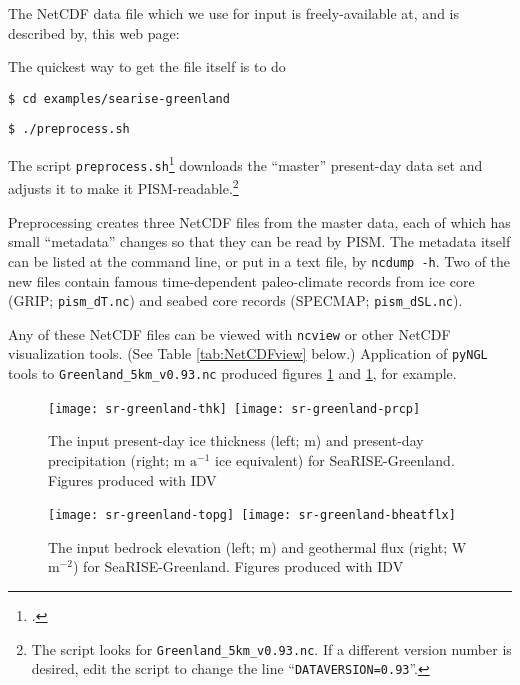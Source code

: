 The NetCDF data file which we use for input is freely-available at, and is described by, this web page: 
\medskip

\centerline{}
\medskip

\noindent The quickest way to get the file itself is to do

\verb|$ cd examples/searise-greenland|

\verb|$ ./preprocess.sh|

\noindent The script \verb|preprocess.sh|\footnote{.} downloads the ``master'' present-day data set and adjusts it to make it PISM-readable.\footnote{The script looks for \texttt{Greenland\_5km\_v0.93.nc}.  If a different version number is desired, edit the script to change the line ``\texttt{DATAVERSION=0.93}''.}

Preprocessing creates three NetCDF files from the master data, each of which has small ``metadata'' changes so that they can be read by PISM.  The metadata itself can be listed at the command line, or put in a text file, by \verb|ncdump -h|.  Two of the new files contain famous time-dependent paleo-climate records from ice core (GRIP; \verb|pism_dT.nc|) and seabed core records (SPECMAP; \verb|pism_dSL.nc|).

Any of these NetCDF files can be viewed with \verb|ncview| or other NetCDF visualization tools.  (See Table \ref{tab:NetCDFview} below.)  Application of \verb|pyNGL| tools to \verb|Greenland_5km_v0.93.nc| produced figures \ref{fig:sr-input1} and  \ref{fig:sr-input1}, for example.

\begin{figure}[ht]
\mbox{\texttt{[image: sr-greenland-thk]}
 \qquad\qquad\texttt{[image: sr-greenland-prcp]}}
\caption{The input present-day ice thickness (left; m) and present-day precipitation (right; m $\text{a}^{-1}$ ice equivalent) for SeaRISE-Greenland.  Figures produced with IDV}
\label{fig:sr-input1}
\end{figure}

\begin{figure}[ht]
\mbox{\texttt{[image: sr-greenland-topg]}
 \qquad\quad \texttt{[image: sr-greenland-bheatflx]}}
\caption{The input bedrock elevation (left; m) and geothermal flux (right; W $\text{m}^{-2}$) for SeaRISE-Greenland.  Figures produced with IDV}
\label{fig:sr-input2}
\end{figure}


